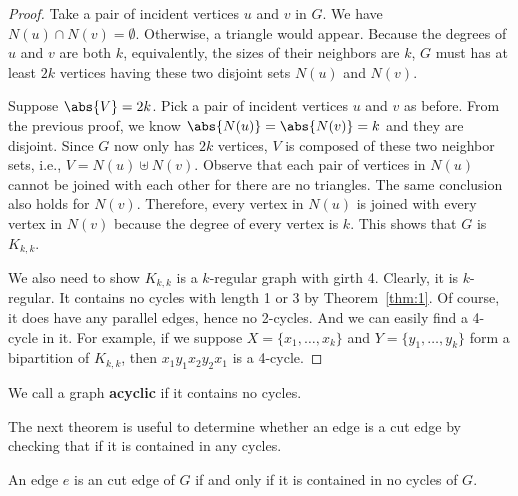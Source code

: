 \documentclass[thmcnt=section, 12pt, color=cyan]{my-elegantbook}
\begin{document}
\begin{proof}
    Take a pair of incident vertices $u$ and $v$ in $G$.
	We have $N(u) \cap N(v) = \emptyset$. 
	Otherwise, a triangle would appear. 
	Because the degrees of $u$ and  $v$ are both $k$,
	equivalently, the sizes of their neighbors are $k$,
	$G$ must has at least $2k$ vertices 
	having these two disjoint sets $N(u)$ and $N(v)$.

	Suppose $\abs{V} = 2k$. 
	Pick a pair of incident vertices $u$ and $v$ as before.
	From the previous proof, we know
	$\abs{N(u)} = \abs{N(v)} = k$ and they are disjoint.
	Since  $G$ now only has  $2k$ vertices,
	$V$ is composed of
	these two neighbor sets, i.e., $V = N(u) \uplus N(v)$.
	Observe that each pair of vertices in  $N(u)$
	cannot be joined with each other for 
	there are no triangles.
	The same conclusion also holds for $N(v)$.
	Therefore, every vertex in 
	$N(u)$ is joined with every vertex in $N(v)$
	because the degree of every vertex is $k$.
	This shows that $G$ is  $K_{k,k}$.

	We also need to show $K_{k,k}$ is a $k$-regular graph with girth 4.
	Clearly, it is $k$-regular. 
	It contains no cycles with length 1 or 3 by Theorem~\ref{thm:1}.
	Of course, it does have any parallel edges, 
	hence no 2-cycles.
	And we can easily find a 4-cycle in it.
	For example, if we suppose 
	$X=\{x_1,\ldots,x_k\}$ and $Y=\{y_1,\ldots,y_k\}$ 
	form a bipartition of $K_{k,k}$, then 
	$x_1 y_1 x_2 y_2 x_1$ is a 4-cycle.
\end{proof}


We call a graph \textbf{acyclic}
if it contains no cycles.


The next theorem is useful to determine
whether an edge is a cut edge by checking
that if it is contained in any cycles.

\begin{theorem} \label{thm:6}
	An edge $e$ is an cut edge of $G$
	if and only if it is contained in no cycles of $G$.
\end{theorem}
\end{document}
